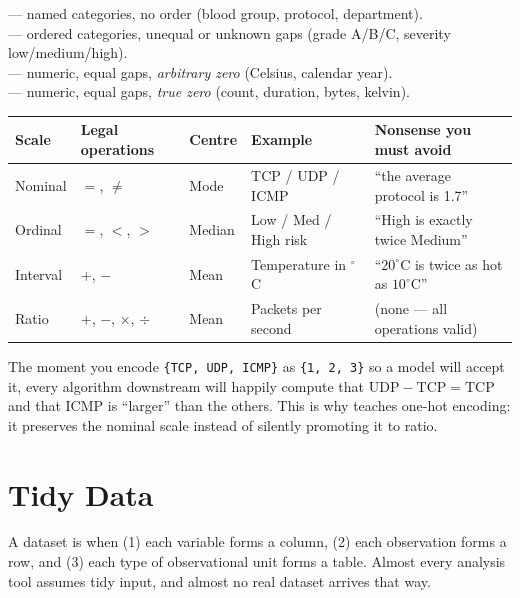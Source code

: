 \begin{definitionbox}
 --- named categories, no order (blood group, protocol, department).\\
 --- ordered categories, unequal or unknown gaps (grade A/B/C, severity low/medium/high).\\
 --- numeric, equal gaps, \emph{arbitrary zero} (Celsius, calendar year).\\
 --- numeric, equal gaps, \emph{true zero} (count, duration, bytes, kelvin).
\end{definitionbox}

\begin{longtable}{@{}L{2.0cm}L{2.6cm}L{2.3cm}L{3.0cm}L{4.2cm}@{}}
\toprule
{}
\textbf{Scale} & \textbf{Legal operations} & \textbf{Centre} & \textbf{Example} & \textbf{Nonsense you must avoid} \\
\midrule
\endhead
Nominal & $=$, $\neq$ & Mode & TCP / UDP / ICMP & ``the average protocol is 1.7'' \\
Ordinal & $=$, $<$, $>$ & Median & Low / Med / High risk & ``High is exactly twice Medium'' \\
Interval & $+$, $-$ & Mean & Temperature in $^\circ$C & ``$20^\circ$C is twice as hot as $10^\circ$C'' \\
Ratio & $+$, $-$, $\times$, $\div$ & Mean & Packets per second & (none --- all operations valid) \\
\bottomrule
\end{longtable}

\begin{alertbox}
The moment you encode \texttt{\{TCP, UDP, ICMP\}} as \texttt{\{1, 2, 3\}} so a
model will accept it, every algorithm downstream will happily compute that
$\text{UDP} - \text{TCP} = \text{TCP}$ and that ICMP is ``larger'' than the others.
This is why  teaches one-hot encoding: it preserves the nominal
scale instead of silently promoting it to ratio.
\end{alertbox}

\section{Tidy Data}

\begin{definitionbox}
A dataset is  when (1) each variable forms a column, (2) each
observation forms a row, and (3) each type of observational unit forms a table.
Almost every analysis tool assumes tidy input, and almost no real dataset arrives
that way.
\end{definitionbox}

